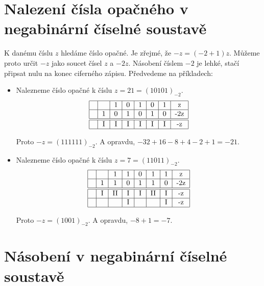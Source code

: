 \documentclass[12pt]{book}
\begin{document}
\section{Nalezení čísla opačného v negabinární číselné soustavě}

K danému číslu $z$ hledáme číslo opačné. Je zřejmé, že $-z = (-2 + 1)z$. Můžeme proto určit $-z$ jako soucet čísel $z$ a $-2z$. Násobení číslem $-2$ je lehké, stačí připsat nulu na konec ciferného zápisu.  Předvedeme na příkladech:

\begin{itemize}
  \item Nalezneme číslo opačné k číslu $z = 21 = (10101)_{-2}$.
  \begin{equation}\label{NBprsoucT6}
 \begin{tabular}{|c|c|c|c|c|c|c|c|}
   \hline
    &  & 1 & 0 & 1 & 0 & 1 & z \\ \hline
    &1 & 0 & 1 & 0 & 1 & 0 & -2z \\ \hline \hline
    & I& I & I & I & I & I & -z \\
   \hline
 \end{tabular}
 \end{equation}
  
 Proto $-z = (111111)_{-2}$. A opravdu, $-32 + 16 - 8 + 4 - 2 + 1 = -21$.
  
  \item Nalezneme číslo opačné k číslu $z = 7 = (11011)_{-2}$.
  \begin{equation}\label{NBprsoucT6}
 \begin{tabular}{|c|c|c|c|c|c|c|c|}
   \hline
    &  & 1 & 1 & 0 & 1 & 1 & z \\ \hline
    & 1& 1 & 0 & 1 & 1 & 0 & -2z \\ \hline \hline
    & I&II & I & I &II & I & -z \\ \hline
    &  &   & I &   &   & I & -z \\ \hline
 \end{tabular}
 \end{equation}

 Proto $-z = (1001)_{-2}$. A opravdu, $- 8 + 1 = -7$.
  
  
  
\end{itemize}

\section{Násobení v negabinární číselné soustavě}
\end{document}
